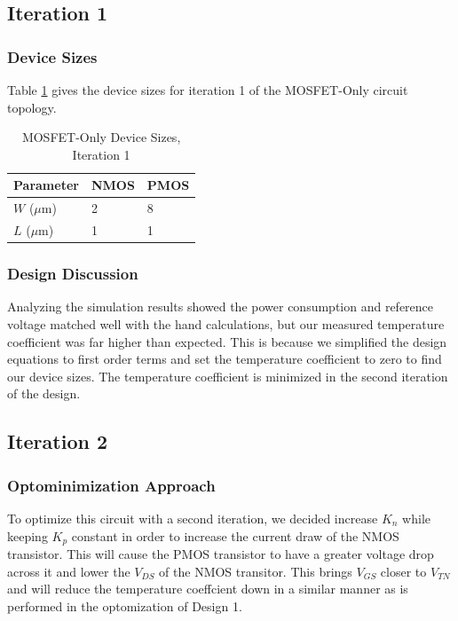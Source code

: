 \documentclass[conference]{IEEEtran}
\begin{document}
\subsection{Iteration 1}
\subsubsection{Device Sizes}
Table \ref{tab:mo-ds-1} gives the device sizes for iteration 1 of the MOSFET-Only circuit topology.
\begin{table}[!htbp]
  \caption[]{MOSFET-Only Device Sizes, Iteration 1}
  \label{tab:mo-ds-1}
  \centering
  \begin{tabular}{|l|l|l|}
    \hline
    Parameter			& NMOS	&PMOS \\ \hline
    $W$ ($\mu$m)		&2		&8\\ 
    $L$ ($\mu$m)		& 1		&1\\
    \hline
  \end{tabular}
\end{table}
\subsubsection{Design Discussion}
Analyzing the simulation results showed the power consumption and reference voltage matched well with the hand calculations, but our measured temperature coefficient was far higher than expected.  This is because we simplified the design equations to first order terms and set the temperature coefficient to zero to find our device sizes.  The temperature coefficient is minimized in the second iteration of the design.

\subsection{Iteration 2}
\subsubsection{Optominimization Approach}
To optimize this circuit with a second iteration, we decided increase $K_n$ while keeping $K_p$ constant in order to increase the current draw of the NMOS transistor.  This will cause the PMOS transistor to have a greater voltage drop across it and lower the $V_{DS}$ of the NMOS transitor.  This brings $V_{GS}$ closer to $V_{TN}$ and will reduce the temperature coeffcient down in a similar manner as is performed in the optomization of Design 1.
\end{document}
